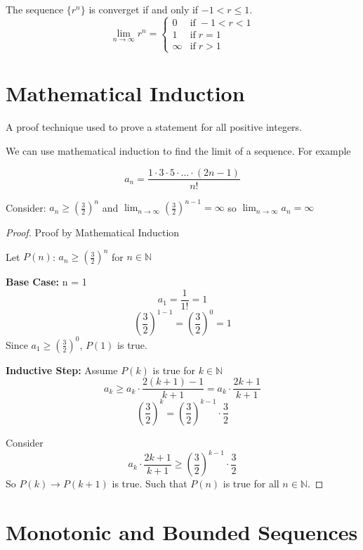 The sequence $\{r^{n}\}$ is converget if and only if $-1 < r \le 1$.
\[
  \lim_{n \to \infty} r^{n} = \begin{cases}
    0 & \text{if} \; -1 < r < 1 \\
    1 & \text{if} \; r = 1 \\
    \infty & \text{if} \; r > 1
  \end{cases}
\]

\section{Mathematical Induction}

\begin{definition}
  A proof technique used to prove a statement for all positive integers.
\end{definition}

We can use mathematical induction to find the limit of a sequence. For example

\begin{equation}
  a_{n} = \frac{1 \cdot 3 \cdot 5 \cdot \dots \cdot (2n - 1)}{n!}
\end{equation}

Consider: $a_{n} \ge (\frac{3}{2})^{n}$ and $\lim_{n \to \infty} (\frac{3}{2})^{n - 1} = \infty$ so $\lim_{n \to \infty} a_{n} = \infty$

\begin{proof}
  Proof by Mathematical Induction

  Let \(P(n)\): $a_{n} \ge (\frac{3}{2})^{n}$ for \(n \in \mathbb{N}\)

  \textbf{Base Case:} n = 1
  \[
    a_{1} = \frac{1}{1!} = 1
  \]
  \[
    (\frac{3}{2})^{1 - 1} = (\frac{3}{2})^0 = 1
  \]
  Since $a_{1} \ge (\frac{3}{2})^{0}$, \(P(1)\) is true.

  \textbf{Inductive Step:} Assume \(P(k)\) is true for \(k \in \mathbb{N}\)
  \[
    a_{k} \ge a_{k} \cdot \frac{2(k + 1) - 1}{k + 1} = a_k \cdot \frac{2k + 1}{k + 1}
  \]
  \[
    (\frac{3}{2})^k = (\frac{3}{2})^{k - 1} \cdot \frac{3}{2}
  \]

  Consider
  \[
    a_{k} \cdot \frac{2k + 1}{k + 1} \ge (\frac{3}{2})^{k - 1} \cdot \frac{3}{2}
  \]
  So \(P(k) \to P(k + 1)\) is true. Such that \(P(n)\) is true for all \(n \in \mathbb{N}\).
\end{proof}

\section{Monotonic and Bounded Sequences}

